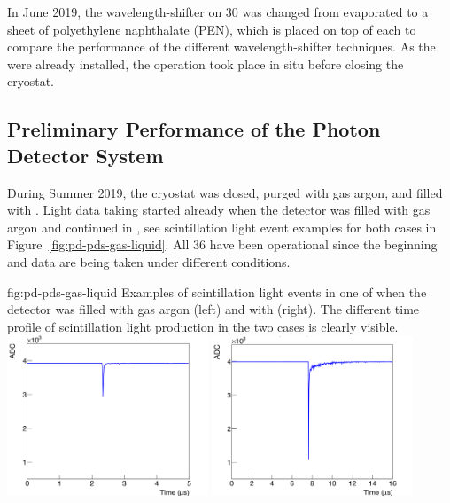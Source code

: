 In June 2019, the wavelength-shifter on 30  was changed from evaporated  to a sheet of polyethylene naphthalate (PEN), which is placed on top of each  to compare the performance of the different wavelength-shifter techniques. As the  were already installed, the operation took place in situ before closing the cryostat. 


\subsection{Preliminary Performance of the  Photon Detector System}

During Summer 2019, the  cryostat was closed, purged with gas argon, and filled with . Light data taking started already when the detector was filled with gas argon and continued in , see scintillation light event examples for both cases in Figure~\ref{fig:pd-pds-gas-liquid}. All 36  have been operational since the beginning and data are being taken under different conditions.

\begin{dunefigure}{fig:pd-pds-gas-liquid} {Examples of scintillation light events in one  of  when the detector was filled with gas argon (left) and with  (right). The different time profile of scintillation light production in the two cases is clearly visible.}
\includegraphics[width=0.45\textwidth]{graphics/dppd_gas.png}
\includegraphics[width=0.45\textwidth]{graphics/dppd_liquid.png}
\end{dunefigure}

